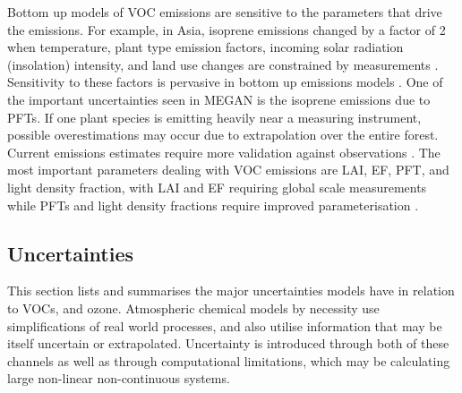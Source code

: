     Bottom up models of VOC emissions are sensitive to the parameters that drive the emissions.
    For example, in Asia, isoprene emissions changed by a factor of 2 when temperature, plant type emission factors, incoming solar radiation (insolation) intensity, and land use changes are constrained by measurements \parencite{Stavrakou2014}.
    Sensitivity to these factors is pervasive in bottom up emissions models \parencite[eg.][]{Marais2014,Miller2014,Messina2016}.
    One of the important uncertainties seen in MEGAN is the isoprene emissions due to PFTs.
    If one plant species is emitting heavily near a measuring instrument, possible overestimations may occur due to extrapolation over the entire forest.
    Current emissions estimates require more validation against observations \parencite{Messina2016}.
    The most important parameters dealing with VOC emissions are LAI, EF, PFT, and light density fraction, with LAI and EF requiring global scale measurements while PFTs and light density fractions require improved parameterisation \parencite{Messina2016}.
    
    
  \subsection{Uncertainties}
  \label{LR:Models:Uncert}
    
    This section lists and summarises the major uncertainties models have in relation to  VOCs, and ozone.
    Atmospheric chemical models by necessity use simplifications of real world processes, and also utilise information that may be itself uncertain or extrapolated.
    Uncertainty is introduced through both of these channels as well as through computational limitations, which may be calculating large non-linear non-continuous systems.
    
